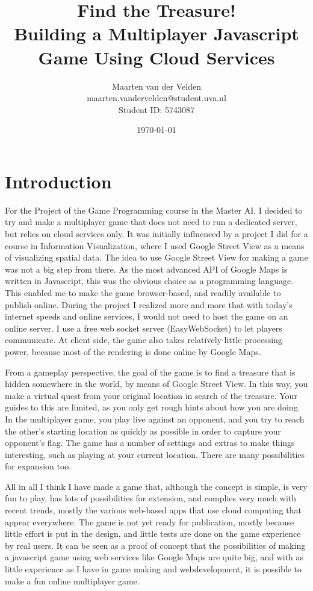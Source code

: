 \documentclass[a4paper,10pt]{article}
\title{Find the Treasure!\\Building a Multiplayer Javascript Game Using Cloud Services}
\author{Maarten van der Velden\\maarten.vandervelden@student.uva.nl\\Student ID: 5743087}
\date{\today}
\begin{document}
\maketitle

\section{Introduction} %
\label{sec:introduction}
For the Project of the Game Programming course in the Master AI, I decided to  try and make a multiplayer game that does not need to run a dedicated server, but relies on cloud services only. It was initially influenced by a project I did for a course in Information Visualization, where I used Google Street View\cite{} as a means of visualizing spatial data. The idea to use Google Street View for making a game was not a big step from there. As the most advanced API of Google Maps \cite{} is written in Javascript, this was the obvious choice as a programming language. This enabled me to make the game browser-based, and readily available to publish
online. During the project I realized more and more that with today's internet speeds and online services, I would not need to host the game on an online server. I use a free web socket server (EasyWebSocket\cite{}) to let players communicate. At client side, the game also takes relatively little processing power, because most of the rendering is done online by Google Maps.

From a gameplay perspective, the goal of the game is to find a treasure that is hidden somewhere in the world, by means of Google Street View. In this way, you make a  virtual quest from your original location in search of the treasure. Your guides to this are limited, as you only get rough hints about how you are doing. In the multiplayer game, you play live against an opponent, and you try to reach the other's starting location as quickly as possible in order to capture your opponent's flag. The game has a number of settings and extras to make things interesting, such as playing at your current location. There are many possibilities for expansion too.

All in all I think I have made a game that, although the concept is simple, is very fun to play, has lots of possibilities for extension, and complies very much with recent trends, mostly the various web-based apps that use cloud computing that appear everywhere. The game is not yet ready for publication, mostly because little effort is put in the design, and little tests are done on the game experience by real users. It can be seen as a proof of concept that the possibilities of making a javascript game using web services like Google Maps are quite big, and with as little experience as I have in game making and webdevelopment, it is possible to make a fun online multiplayer game.
\end{document}
